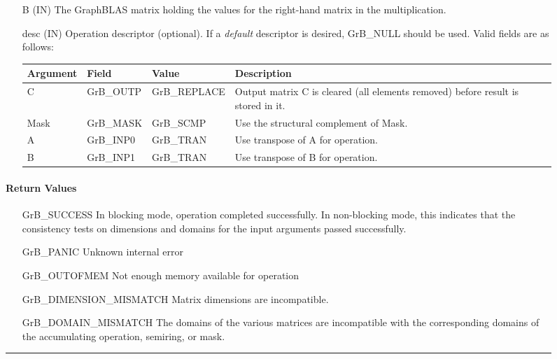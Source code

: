 \begin{figure*}[h]
\begin{itemize}[leftmargin=1.1in]
    \item[{\sf B}] ({\sf IN}) The GraphBLAS matrix holding the values
    for the right-hand matrix in the multiplication.

    \item[{\sf desc}] ({\sf IN}) Operation descriptor (optional). If
    a \emph{default} descriptor is desired, {\sf GrB\_NULL} should be
    used. Valid fields are as follows: 

    \begin{tabular}{lllp{2.75in}}
    Argument   & Field           & Value               & Description \\ \hline
    {\sf C}    & {\sf GrB\_OUTP} & {\sf GrB\_REPLACE}  & Output matrix {\sf C} is cleared (all elements removed) before result is stored in it. \\
    {\sf Mask} & {\sf GrB\_MASK} & {\sf GrB\_SCMP}     & Use the structural complement of {\sf Mask}. \\
    {\sf A}    & {\sf GrB\_INP0} & {\sf GrB\_TRAN}     & Use transpose of {\sf A} for operation. \\
    {\sf B}    & {\sf GrB\_INP1} & {\sf GrB\_TRAN}     & Use transpose of {\sf B} for operation. \\
    \end{tabular}
\end{itemize}

\paragraph{Return Values}

\begin{itemize}[leftmargin=2.1in]

	\item[{\sf GrB\_SUCCESS}]	      In blocking mode, operation
	completed successfully. In non-blocking mode, this indicates
	that the consistency tests on dimensions and domains for the
	input arguments passed successfully.  

	\item[{\sf GrB\_PANIC}]		      Unknown internal error

	\item[{\sf GrB\_OUTOFMEM}]	      Not enough memory available
	for operation

	\item[{\sf GrB\_DIMENSION\_MISMATCH}] Matrix dimensions are
	incompatible.

	\item[{\sf GrB\_DOMAIN\_MISMATCH}]    The domains of the various
	matrices are incompatible with the corresponding domains of the
	accumulating operation, semiring, or mask.

\end{itemize}

\hrule
\end{figure*}
